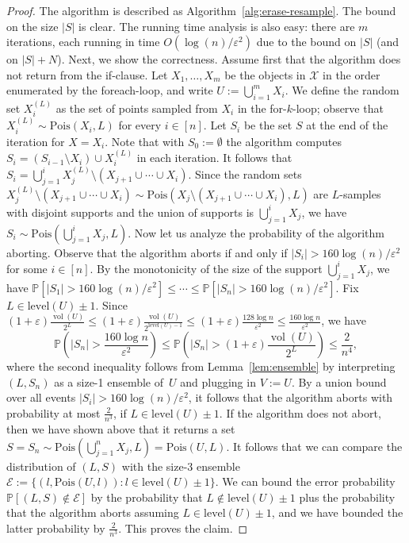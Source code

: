 \documentclass[11pt]{article}
\def\vol{\operatorname{vol}}		%
\newcommand{\Pois}{\mathrm{Pois}}
\newcommand{\level}{\mathrm{level}}
\newcommand{\eps}{\varepsilon}
\renewcommand{\Pr}{\mathbb{P}}
\newcommand{\class}[1]{\mathcal{#1}}
\begin{document}
\begin{proof}
    The algorithm is described as Algorithm~\ref{alg:erase-resample}.
    The bound on the size $|S|$ is clear. The running time analysis is also easy: there are $m$ iterations, each running in time $O(\log(n)/\eps^2)$ due to the bound on $|S|$ (and on $|S|+N$).
%
    Next, we show the correctness. 
    Assume first that the algorithm does not return from the if-clause.
    Let $X_1, \dots, X_m$ be the objects in $\class{X}$ in the order enumerated by the foreach-loop, and write $U := \bigcup_{i=1}^m X_i$.
    We define the random set $X_i^{(L)}$ as the set of points sampled from $X_i$ in the for-$k$-loop; observe that $X_i^{(L)} \sim \Pois(X_i, L)$ for every $i \in [n]$.
    Let $S_i$ be the set $S$ at the end of the iteration for $X = X_i$. Note that with $S_0 := \emptyset$ the algorithm computes $S_i = (S_{i-1} \setminus X_i) \cup X_i^{(L)}$ in each iteration.
    It follows that $S_i = \bigcup_{j=1}^i X_j^{(L)} \setminus (X_{j+1} \cup \cdots \cup X_i)$. Since the random sets $X_j^{(L)} \setminus (X_{j+1} \cup \cdots \cup X_i) \sim \Pois(X_j \setminus (X_{j+1} \cup \cdots \cup X_i), L)$ are $L$-samples with disjoint supports and the union of supports is $\bigcup_{j=1}^i X_j$, we have $S_i \sim \Pois(\bigcup_{j=1}^i X_j, L)$.
%
    Now let us analyze the probability of the algorithm aborting. Observe that the algorithm aborts if and only if $|S_i| > 160 \log(n)/\eps^2$ for some $i \in [n]$. By the monotonicity of the size of the support $\bigcup_{j=1}^i X_j$, we have $\Pr[|S_1| > 160 \log(n)/\eps^2] \le \cdots \le \Pr[|S_n| > 160 \log(n)/\eps^2]$.
    Fix $L \in \level(U) \pm 1$. Since $(1 + \eps) \frac{\vol(U)}{2^L} \leq (1 + \eps) \frac{\vol(U)}{2^{\level(U)-1}} \leq (1+\eps) \frac{128 \log n}{\eps^2} \leq \frac{160 \log n}{\eps^2}$, we have
    \[
        \Pr\left( |S_n| > \frac{160 \log n}{\eps^2} \right)
        \leq \Pr\left( |S_n| > (1 + \eps) \frac{\vol(U)}{2^L} \right)
        \leq \frac{2}{n^4},
    \]
    where the second inequality follows from Lemma~\ref{lem:ensemble} by interpreting $(L,S_n)$ as a size-1 ensemble of~$U$ and plugging in $V := U$.
    By a union bound over all events $|S_i| > 160 \log(n)/\eps^2$, it follows that the algorithm aborts with probability at most $\tfrac 2{n^3}$, if $L \in \level(U) \pm 1$.
%
    If the algorithm does not abort, then we have shown above that it returns a set $S = S_n \sim \Pois(\bigcup_{j=1}^n X_j, L) = \Pois(U, L)$. 
    It follows that we can compare the distribution of $(L,S)$ with the size-3 ensemble $\mathcal{E} := \{(l, \Pois(U,l)) \colon l \in \level(U) \pm 1\}$. We can bound the error probability $\Pr[(L,S) \not\in \mathcal{E}]$ by the probability that $L \not\in \level(U) \pm 1$ plus the probability that the algorithm aborts assuming $L \in \level(U) \pm 1$, and we have bounded the latter probability by $\tfrac 2{n^3}$. This proves the claim.
\end{proof}
%
\end{document}

